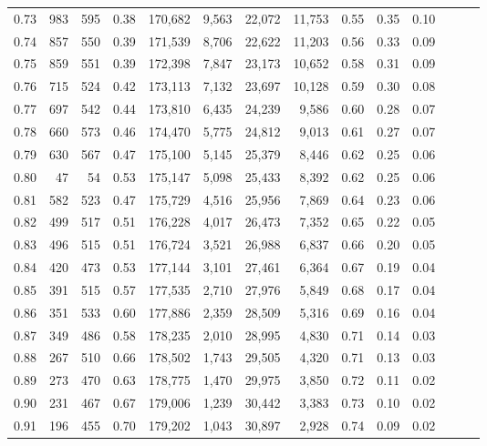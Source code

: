 \begin{tabular}{rrrrrrrrrrrrrr}
0.73 &    983 &  595 &  0.38 &  170,682 &    9,563 &  22,072 &  11,753 &  0.55 &  0.35 &      0.10 \\
0.74 &    857 &  550 &  0.39 &  171,539 &    8,706 &  22,622 &  11,203 &  0.56 &  0.33 &      0.09 \\
0.75 &    859 &  551 &  0.39 &  172,398 &    7,847 &  23,173 &  10,652 &  0.58 &  0.31 &      0.09 \\
0.76 &    715 &  524 &  0.42 &  173,113 &    7,132 &  23,697 &  10,128 &  0.59 &  0.30 &      0.08 \\
0.77 &    697 &  542 &  0.44 &  173,810 &    6,435 &  24,239 &   9,586 &  0.60 &  0.28 &      0.07 \\
0.78 &    660 &  573 &  0.46 &  174,470 &    5,775 &  24,812 &   9,013 &  0.61 &  0.27 &      0.07 \\
0.79 &    630 &  567 &  0.47 &  175,100 &    5,145 &  25,379 &   8,446 &  0.62 &  0.25 &      0.06 \\
0.80 &     47 &   54 &  0.53 &  175,147 &    5,098 &  25,433 &   8,392 &  0.62 &  0.25 &      0.06 \\
0.81 &    582 &  523 &  0.47 &  175,729 &    4,516 &  25,956 &   7,869 &  0.64 &  0.23 &      0.06 \\
0.82 &    499 &  517 &  0.51 &  176,228 &    4,017 &  26,473 &   7,352 &  0.65 &  0.22 &      0.05 \\
0.83 &    496 &  515 &  0.51 &  176,724 &    3,521 &  26,988 &   6,837 &  0.66 &  0.20 &      0.05 \\
0.84 &    420 &  473 &  0.53 &  177,144 &    3,101 &  27,461 &   6,364 &  0.67 &  0.19 &      0.04 \\
0.85 &    391 &  515 &  0.57 &  177,535 &    2,710 &  27,976 &   5,849 &  0.68 &  0.17 &      0.04 \\
0.86 &    351 &  533 &  0.60 &  177,886 &    2,359 &  28,509 &   5,316 &  0.69 &  0.16 &      0.04 \\
0.87 &    349 &  486 &  0.58 &  178,235 &    2,010 &  28,995 &   4,830 &  0.71 &  0.14 &      0.03 \\
0.88 &    267 &  510 &  0.66 &  178,502 &    1,743 &  29,505 &   4,320 &  0.71 &  0.13 &      0.03 \\
0.89 &    273 &  470 &  0.63 &  178,775 &    1,470 &  29,975 &   3,850 &  0.72 &  0.11 &      0.02 \\
0.90 &    231 &  467 &  0.67 &  179,006 &    1,239 &  30,442 &   3,383 &  0.73 &  0.10 &      0.02 \\
0.91 &    196 &  455 &  0.70 &  179,202 &    1,043 &  30,897 &   2,928 &  0.74 &  0.09 &      0.02 \\

\end{tabular}
